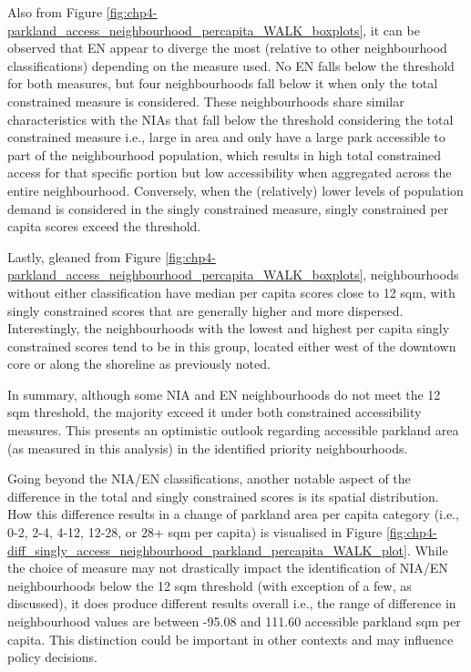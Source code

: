 \documentclass[
11pt, %
oneside, %
english, %
singlespacing, %
]{macthesis} %
\begin{document}
Also from Figure \ref{fig:chp4-parkland_access_neighbourhood_percapita_WALK_boxplots}, it can be observed that EN appear to diverge the most (relative to other neighbourhood classifications) depending on the measure used. No EN falls below the threshold for both measures, but four neighbourhoods fall below it when only the total constrained measure is considered. These neighbourhoods share similar characteristics with the NIAs that fall below the threshold considering the total constrained measure i.e., large in area and only have a large park accessible to part of the neighbourhood population, which results in high total constrained access for that specific portion but low accessibility when aggregated across the entire neighbourhood. Conversely, when the (relatively) lower levels of population demand is considered in the singly constrained measure, singly constrained per capita scores exceed the threshold.

Lastly, gleaned from Figure \ref{fig:chp4-parkland_access_neighbourhood_percapita_WALK_boxplots}, neighbourhoods without either classification have median per capita scores close to 12 sqm, with singly constrained scores that are generally higher and more dispersed. Interestingly, the neighbourhoods with the lowest and highest per capita singly constrained scores tend to be in this group, located either west of the downtown core or along the shoreline as previously noted.

In summary, although some NIA and EN neighbourhoods do not meet the 12 sqm threshold, the majority exceed it under both constrained accessibility measures. This presents an optimistic outlook regarding accessible parkland area (as measured in this analysis) in the identified priority neighbourhoods.

Going beyond the NIA/EN classifications, another notable aspect of the difference in the total and singly constrained scores is its spatial distribution. How this difference results in a change of parkland area per capita category (i.e., 0-2, 2-4, 4-12, 12-28, or 28+ sqm per capita) is visualised in Figure \ref{fig:chp4-diff_singly_access_neighbourhood_parkland_percapita_WALK_plot}. While the choice of measure may not drastically impact the identification of NIA/EN neighbourhoods below the 12 sqm threshold (with exception of a few, as discussed), it does produce different results overall i.e., the range of difference in neighbourhood values are between -95.08 and 111.60 accessible parkland sqm per capita. This distinction could be important in other contexts and may influence policy decisions.
\end{document}
